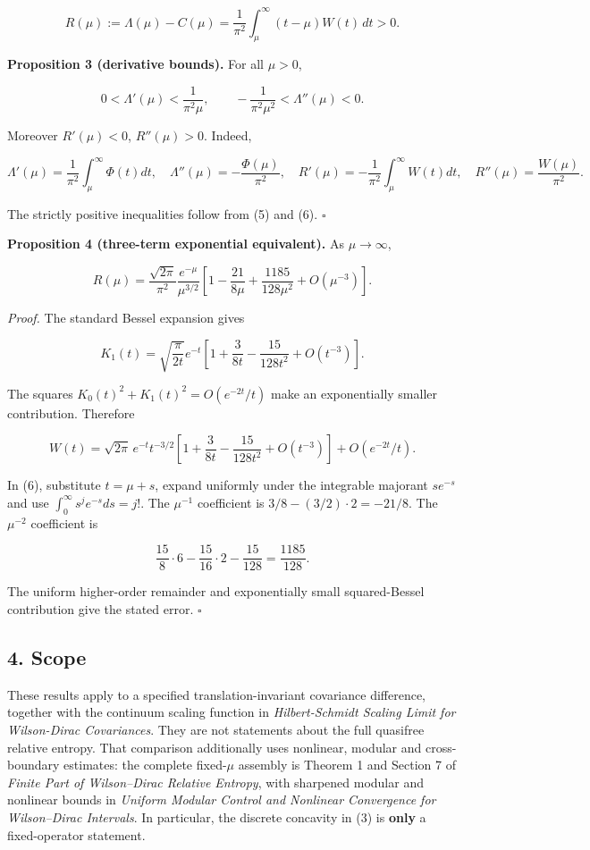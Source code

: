 \documentclass[
  10pt,
  a4paper,
]{article}
\begin{document}
\[
R(\mu):=\Lambda(\mu)-C(\mu)
=\frac1{\pi^2}\int_\mu^\infty(t-\mu)W(t)\,dt>0.
\tag{6}
\]

\textbf{Proposition 3 (derivative bounds).} For all \(\mu>0\),

\[
\boxed{0<\Lambda'(\mu)<\frac1{\pi^2\mu},\qquad
-\frac1{\pi^2\mu^2}<\Lambda''(\mu)<0.}
\tag{7}
\]

Moreover \(R'(\mu)<0\), \(R''(\mu)>0\). Indeed,

\[
\Lambda'(\mu)=\frac1{\pi^2}\int_\mu^\infty\Phi(t)dt,
\quad\Lambda''(\mu)=-\frac{\Phi(\mu)}{\pi^2},
\quad R'(\mu)=-\frac1{\pi^2}\int_\mu^\infty W(t)dt,
\quad R''(\mu)=\frac{W(\mu)}{\pi^2}.
\]

The strictly positive inequalities follow from (5) and (6). \(\square\)

\textbf{Proposition 4 (three-term exponential equivalent).} As \(\mu\to\infty\),

\[
\boxed{R(\mu)=\frac{\sqrt{2\pi}}{\pi^2}\frac{e^{-\mu}}{\mu^{3/2}}
\left[1-\frac{21}{8\mu}+\frac{1185}{128\mu^2}+O(\mu^{-3})\right].}
\tag{8}
\]

\emph{Proof.} The standard Bessel expansion gives

\[
K_1(t)=\sqrt{\frac\pi{2t}}e^{-t}
\left[1+\frac3{8t}-\frac{15}{128t^2}+O(t^{-3})\right].
\]

The squares \(K_0(t)^2+K_1(t)^2=O(e^{-2t}/t)\) make an exponentially smaller contribution. Therefore

\[
W(t)=\sqrt{2\pi}\,e^{-t}t^{-3/2}
\left[1+\frac3{8t}-\frac{15}{128t^2}+O(t^{-3})\right]
+O(e^{-2t}/t).
\]

In (6), substitute \(t=\mu+s\), expand uniformly under the integrable majorant \(s e^{-s}\) and use \(\int_0^\infty s^j e^{-s}ds=j!\). The \(\mu^{-1}\) coefficient is \(3/8-(3/2)\cdot2=-21/8\). The \(\mu^{-2}\) coefficient is

\[
\frac{15}{8}\cdot6-\frac{15}{16}\cdot2-\frac{15}{128}=\frac{1185}{128}.
\]

The uniform higher-order remainder and exponentially small squared-Bessel contribution give the stated error. \(\square\)

\subsection{4. Scope}\label{scope}

These results apply to a specified translation-invariant covariance difference, together with the continuum scaling function in \emph{Hilbert-Schmidt Scaling Limit for Wilson-Dirac Covariances}. They are not statements about the full quasifree relative entropy. That comparison additionally uses nonlinear, modular and cross-boundary estimates: the complete fixed-\(\mu\) assembly is Theorem 1 and Section 7 of \emph{Finite Part of Wilson--Dirac Relative Entropy}, with sharpened modular and nonlinear bounds in \emph{Uniform Modular Control and Nonlinear Convergence for Wilson--Dirac Intervals}. In particular, the discrete concavity in (3) is \textbf{only} a fixed-operator statement.
\end{document}

